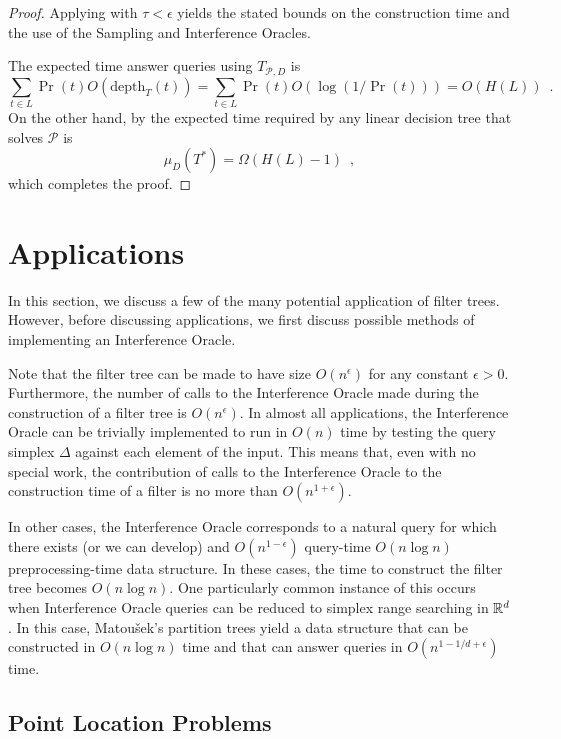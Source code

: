 \documentclass{patmorin}
\newcommand{\depth}{\mathrm{depth}}
\begin{document}
\begin{proof}
  Applying  with $\tau < \epsilon$
  yields the stated bounds on the construction time and the use of the
  Sampling and Interference Oracles.

  The expected time answer queries using $T_{\mathcal{P},D}$ is
  \[
     \sum_{t\in L} \Pr(t)O(\depth_T(t)) 
          = \sum_{t\in L}\Pr(t)O(\log(1/\Pr(t))) = O(H(L)) \enspace .
  \]
  On the other hand, by  the expected time required
  by any linear decision tree that solves $\mathcal{P}$ is
  \[
      \mu_D(T^*) = \Omega(H(L) - 1) \enspace ,
  \]
  which completes the proof.
\end{proof}

\section{Applications}

In this section, we discuss a few of the many potential application of
filter trees.  However, before discussing applications, we first discuss
possible methods of implementing an Interference Oracle.

Note that the filter tree can be made to have size $O(n^\epsilon)$
for any constant $\epsilon > 0$.  Furthermore, the number of calls to
the Interference Oracle made during the construction of a filter tree
is $O(n^\epsilon)$.  In almost all applications, the Interference Oracle
can be trivially implemented to run in $O(n)$ time by testing the query
simplex $\Delta$ against each element of the input.  This means that, even
with no special work, the contribution of calls to the Interference Oracle
to the construction time of a filter is no more than $O(n^{1+\epsilon})$.

In other cases, the Interference Oracle corresponds to a natural query
for which there exists (or we can develop) and $O(n^{1-\epsilon})$
query-time $O(n\log n)$ preprocessing-time data structure.  In these
cases, the time to construct the filter tree becomes $O(n\log n)$.
One particularly common instance of this occurs when Interference
Oracle queries can be reduced to simplex range searching in $\mathbb{R}^d$.
In this case, Matou\v{s}ek's partition trees yield a data structure that
can be constructed in $O(n\log n)$ time and that can answer queries in
$O(n^{1-1/d+\epsilon})$ time.


\subsection{Point Location Problems}
\end{document}
